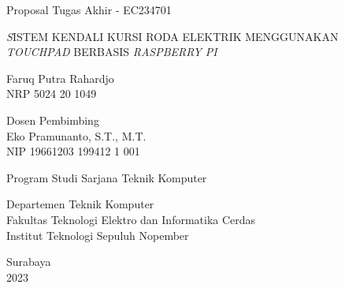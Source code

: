 \begin{large}
  Proposal Tugas Akhir - EC234701
\end{large}

\vspace{\fill}

\begin{spacing}{1.5}
  \begin{Large}
    \emph SISTEM KENDALI KURSI RODA ELEKTRIK MENGGUNAKAN \textit{TOUCHPAD} BERBASIS \textit{RASPBERRY PI}	
  \end{Large}
\end{spacing}

\vspace{\fill}

\begin{large}
  Faruq Putra Rahardjo \\
  \textmd{NRP 5024 20 1049}
\end{large}

\vspace{\fill}

\begin{large}
  \textmd{Dosen Pembimbing} \\
  Eko Pramunanto, S.T., M.T. \\
  \textmd{NIP 19661203 199412 1 001} \\  
\end{large}

\vspace{\fill}

Program Studi Sarjana Teknik Komputer \\

\mdseries

Departemen Teknik Komputer \\
Fakultas Teknologi Elektro dan Informatika Cerdas \\
Institut Teknologi Sepuluh Nopember

Surabaya \\
2023
